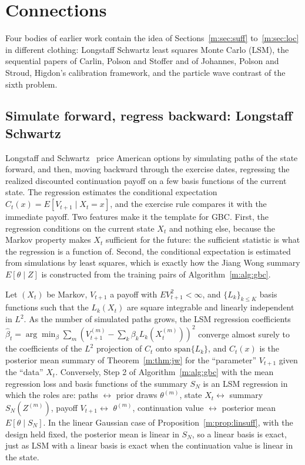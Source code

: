 \section{Connections}\label{m:sec:connections}

Four bodies of earlier work contain the idea of Sections~\ref{m:sec:suff} to~\ref{m:sec:loc} in different clothing: Longstaff Schwartz least squares Monte Carlo (LSM), the sequential papers of Carlin, Polson and Stoffer and of Johannes, Polson and Stroud, Higdon's calibration framework, and the particle wave contrast of the sixth problem.

\subsection{Simulate forward, regress backward: Longstaff Schwartz}\label{m:sec:lsm}

Longstaff and Schwartz~\cite{longstaffschwartz2001} price American options by simulating paths of the state forward, and then, moving backward through the exercise dates, regressing the realized discounted continuation payoff on a few basis functions of the current state. The regression estimates the conditional expectation $C_t(x)=E[V_{t+1}\mid X_t=x]$, and the exercise rule compares it with the immediate payoff. Two features make it the template for GBC. First, the regression conditions on the current state $X_t$ and nothing else, because the Markov property makes $X_t$ sufficient for the future: the sufficient statistic is what the regression is a function of. Second, the conditional expectation is estimated from simulations by least squares, which is exactly how the Jiang Wong summary $E[\theta\mid Z]$ is constructed from the training pairs of Algorithm~\ref{m:alg:gbc}.

\begin{proposition}\label{m:prop:lsm}
Let $(X_t)$ be Markov, $V_{t+1}$ a payoff with $EV_{t+1}^2<\infty$, and $\{L_k\}_{k\le K}$ basis functions such that the $L_k(X_t)$ are square integrable and linearly independent in $L^2$. As the number of simulated paths grows, the LSM regression coefficients $\hat\beta_t=\arg\min_\beta\sum_m(V^{(m)}_{t+1}-\sum_k\beta_kL_k(X^{(m)}_t))^2$ converge almost surely to the coefficients of the $L^2$ projection of $C_t$ onto $\mathrm{span}\{L_k\}$, and $C_t(x)$ is the posterior mean summary of Theorem~\ref{m:thm:jw} for the ``parameter'' $V_{t+1}$ given the ``data'' $X_t$. Conversely, Step 2 of Algorithm~\ref{m:alg:gbc} with the mean regression loss and basis functions of the summary $S_N$ is an LSM regression in which the roles are: paths $\leftrightarrow$ prior draws $\theta^{(m)}$, state $X_t\leftrightarrow$ summary $S_N(Z^{(m)})$, payoff $V_{t+1}\leftrightarrow$ $\theta^{(m)}$, continuation value $\leftrightarrow$ posterior mean $E[\theta\mid S_N]$. In the linear Gaussian case of Proposition~\ref{m:prop:linsuff}, with the design held fixed, the posterior mean is linear in $S_N$, so a linear basis is exact, just as LSM with a linear basis is exact when the continuation value is linear in the state.
\end{proposition}

